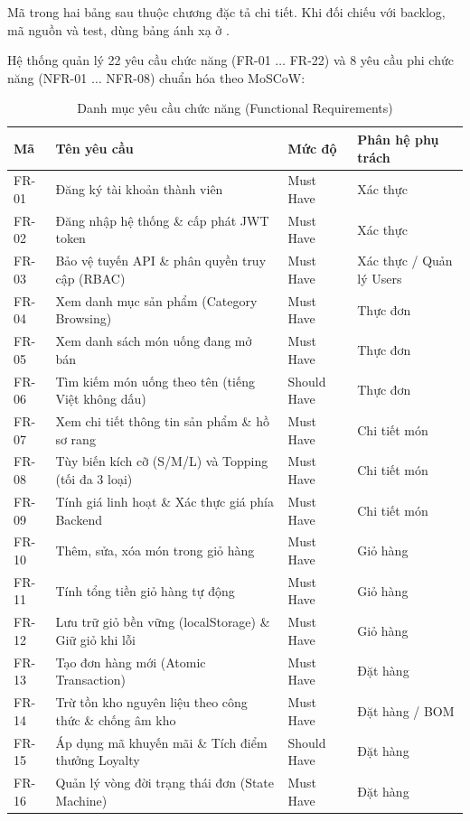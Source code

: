 Mã trong hai bảng sau thuộc chương đặc tả chi tiết. Khi đối chiếu với backlog, mã nguồn
và test, dùng bảng ánh xạ ở .

Hệ thống quản lý 22 yêu cầu chức năng (FR-01 $\dots$ FR-22) và 8 yêu cầu phi chức năng (NFR-01 $\dots$ NFR-08) chuẩn hóa theo MoSCoW:

\begin{table}[H]
\centering\footnotesize
\caption{Danh mục yêu cầu chức năng (Functional Requirements)}
\label{tab:fr-summary}
\begin{tabularx}{\textwidth}{@{}p{1.4cm} X p{2.4cm} p{3.0cm}@{}}
\toprule
\textbf{Mã} & \textbf{Tên yêu cầu} & \textbf{Mức độ} & \textbf{Phân hệ phụ trách} \\
\midrule
FR-01 & Đăng ký tài khoản thành viên & Must Have & Xác thực \\
FR-02 & Đăng nhập hệ thống \& cấp phát JWT token & Must Have & Xác thực \\
FR-03 & Bảo vệ tuyến API \& phân quyền truy cập (RBAC) & Must Have & Xác thực / Quản lý Users \\
FR-04 & Xem danh mục sản phẩm (Category Browsing) & Must Have & Thực đơn \\
FR-05 & Xem danh sách món uống đang mở bán & Must Have & Thực đơn \\
FR-06 & Tìm kiếm món uống theo tên (tiếng Việt không dấu) & Should Have & Thực đơn \\
FR-07 & Xem chi tiết thông tin sản phẩm \& hồ sơ rang & Must Have & Chi tiết món \\
FR-08 & Tùy biến kích cỡ (S/M/L) và Topping (tối đa 3 loại) & Must Have & Chi tiết món \\
FR-09 & Tính giá linh hoạt \& Xác thực giá phía Backend & Must Have & Chi tiết món \\
FR-10 & Thêm, sửa, xóa món trong giỏ hàng & Must Have & Giỏ hàng \\
FR-11 & Tính tổng tiền giỏ hàng tự động & Must Have & Giỏ hàng \\
FR-12 & Lưu trữ giỏ bền vững (localStorage) \& Giữ giỏ khi lỗi & Must Have & Giỏ hàng \\
FR-13 & Tạo đơn hàng mới (Atomic Transaction) & Must Have & Đặt hàng \\
FR-14 & Trừ tồn kho nguyên liệu theo công thức \& chống âm kho & Must Have & Đặt hàng / BOM \\
FR-15 & Áp dụng mã khuyến mãi \& Tích điểm thưởng Loyalty & Should Have & Đặt hàng \\
FR-16 & Quản lý vòng đời trạng thái đơn (State Machine) & Must Have & Đặt hàng \\

\end{tabularx}
\end{table}

